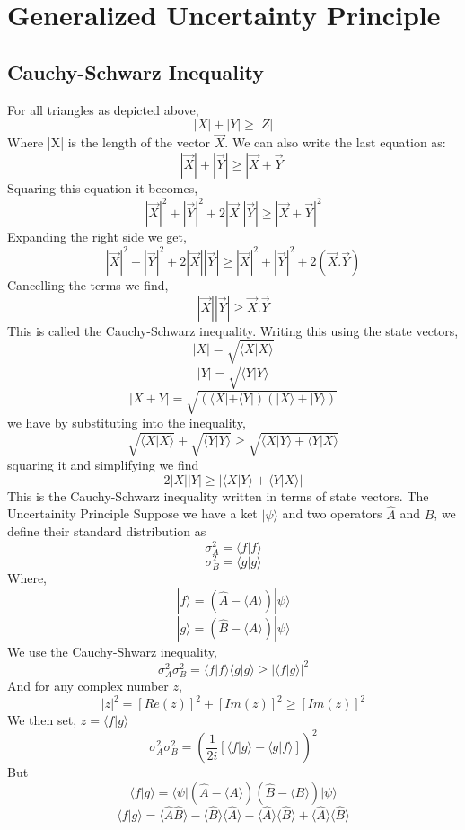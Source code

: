 \section{Generalized Uncertainty Principle}
\subsection{Cauchy-Schwarz Inequality}
For all triangles as depicted above, 
$$|X| + |Y| \geq |Z|$$
Where |X| is the length of the vector $\vec{X}$. We can also write the last equation as:
$$|\vec{X}| + |\vec{Y}| \geq |\vec{X} + \vec{Y}|$$
Squaring this equation it becomes, 
$$|\vec{X}|^2 + |\vec{Y}|^2 + 2|\vec{X}||\vec{Y}| \geq |\vec{X} + \vec{Y}|^2$$
Expanding the right side we get, 
$$|\vec{X}|^2 + |\vec{Y}|^2 + 2|\vec{X}||\vec{Y}| \geq |\vec{X}|^2 + |\vec{Y}|^2 + 2(\vec{X}.\vec{Y})$$ 
Cancelling the terms we find, 
$$|\vec{X}||\vec{Y}| \geq \vec{X}.\vec{Y}$$ 
This is called the Cauchy-Schwarz inequality. Writing this using the state vectors, $$|X| = \sqrt{\langle X| X \rangle}$$
$$|Y| = \sqrt{\langle Y| Y \rangle}$$ 
$$|X + Y| = \sqrt{(\langle X | + \langle Y |)(|X\rangle + |Y\rangle)}$$ 
we have by substituting into the inequality, 
$$\sqrt{\langle X| X \rangle} + \sqrt{\langle Y | Y \rangle} \geq \sqrt{\langle X|Y \rangle + \langle Y|X \rangle}$$ 
squaring it and simplifying we find 
$$2|X||Y| \geq |\langle X|Y \rangle + \langle Y|X \rangle |$$
This is the Cauchy-Schwarz inequality written in terms of state vectors.
The Uncertainity Principle
Suppose we have a ket $| \psi \rangle$ and two operators $\hat{A}$ and $\hat{B}$, we define their standard distribution as
$$\sigma^{2}_{A} = \langle f | f \rangle$$
$$\sigma^{2}_{B} = \langle g | g \rangle$$
Where,
$$| f \rangle = (\hat{A} - \langle A \rangle)| \psi \rangle$$
$$| g \rangle = (\hat{B} - \langle A \rangle)| \psi \rangle $$
We use the Cauchy-Shwarz inequality,
$$\sigma^{2}_{A} \sigma^{2}_{B} = \langle f  | f \rangle \langle g | g \rangle \geq  {|\langle f|g \rangle|}^{2}$$
And for any complex number $z$,
$${|z|}^{2} = {[Re(z)]}^{2} + {[Im(z)]}^{2} \geq {[Im(z)]}^{2}$$
We then set, $z = \langle f | g \rangle$
$$\sigma^{2}_{A} \sigma^{2}_{B} = {\left(\frac{1}{2i} [ \langle f | g \rangle - \langle g | f \rangle]\right)}^{2}$$
But
$$\langle f | g \rangle = \langle \psi | ( \hat{A} - \langle A \rangle ) (\hat{B} - \langle B \rangle) | \psi \rangle$$
$$\langle f | g \rangle = \langle \hat{A}\hat{B} \rangle - \langle \hat{B} \rangle \langle \hat{A} \rangle - \langle \hat{A} \rangle \langle \hat{B} \rangle + \langle \hat{A} \rangle \langle \hat{B} \rangle$$
